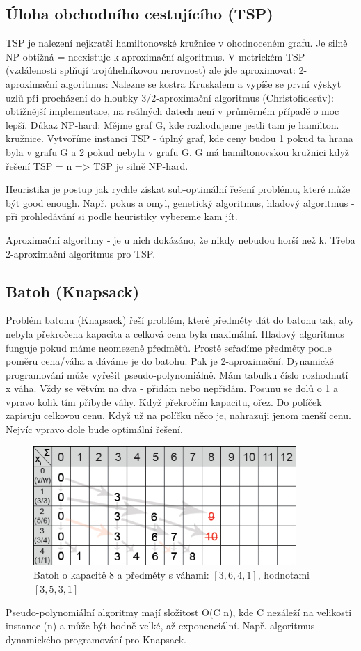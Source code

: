 \subsection{Úloha obchodního cestujícího (TSP)}
TSP je nalezení nejkratší hamiltonovské kružnice v ohodnoceném grafu. Je silně NP-obtížná = neexistuje k-aproximační algoritmus. V metrickém TSP (vzdálenosti splňují trojúhelníkovou nerovnost) ale jde aproximovat: 2-aproximační algoritmus: Nalezne se kostra Kruskalem a vypíše se první výskyt uzlů při procházení do hloubky 3/2-aproximační algoritmus (Christofidesův): obtížnější implementace, na reálných datech není v průměrném případě o moc lepší. Důkaz NP-hard: Mějme graf G, kde rozhodujeme jestli tam je hamilton. kružnice. Vytvoříme instanci TSP - úplný graf, kde ceny budou 1 pokud ta hrana byla v grafu G a 2 pokud nebyla v grafu G. G má hamiltonovskou kružnici když řešení TSP = n => TSP je silně NP-hard.

Heuristika je postup jak rychle získat sub-optimální řešení problému, které může být good enough. Např. pokus a omyl, genetický algoritmus, hladový algoritmus - při prohledávání si podle heuristiky vybereme kam jít.

Aproximační algoritmy - je u nich dokázáno, že nikdy nebudou horší než k. Třeba 2-aproximační algoritmus pro TSP.

\subsection{Batoh (Knapsack)}
Problém batohu (Knapsack) řeší problém, které předměty dát do batohu tak, aby nebyla překročena kapacita a celková cena byla maximální. Hladový algoritmus funguje pokud máme neomezeně předmětů. Prostě seřadíme předměty podle poměru cena/váha a dáváme je do batohu. Pak je 2-aproximační. Dynamické programování může vyřešit pseudo-polynomiálně. Mám tabulku číslo rozhodnutí x váha. Vždy se větvím na dva - přidám nebo nepřidám. Posunu se dolů o 1 a vpravo kolik tím přibyde váhy. Když překročím kapacitu, ořez. Do políček zapisuju celkovou cenu. Když už na políčku něco je, nahrazuji jenom menší cenu. Nejvíc vpravo dole bude optimální řešení.

\begin{figure}[h]
    \begin{center}
        \includegraphics[width=100mm]{09/images/knapsack}
    \end{center}
    \caption{Batoh o kapacitě 8 a předměty s váhami: $[3,6,4,1]$, hodnotami $[3, 5, 3, 1]$}
\end{figure}

Pseudo-polynomiální algoritmy mají složitost O(C n), kde C nezáleží na velikosti instance (n) a může být hodně velké, až exponenciální. Např. algoritmus dynamického programování pro Knapsack.
